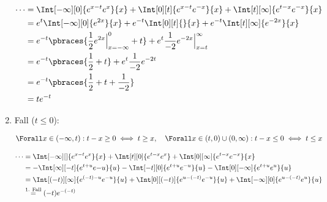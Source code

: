 \begin{solution}
\begin{enumerate}[label = \arabic*.]
    \begin{align*}
        \cdots
        & =
        \Int[-\infty][0]
        {
            e^{x - t}
            e^x
        }{x}
        +
        \Int[0][t]
        {
            e^{x - t}
            e^{-x}
        }{x}
        +
        \Int[t][\infty]
        {
            e^{t - x}
            e^{-x}
        }{x} \\
        & =
        e^{t}
        \Int[-\infty][0]
        {
            e^{2x}
        }{x}
        +
        e^{-t}
        \Int[0][t]{}{x}
        +
        e^{-t}
        \Int[t][\infty]
        {
            e^{-2 x}
        }{x} \\
        & =
        e^{-t}
        \pbraces
        {
            \frac{1}{2}
            e^{2 x} \Big |_{x = -\infty}^0
            +
            t
        }
        +
        e^t
        \frac{1}{-2}
        e^{-2 x} \Big |_{x=t}^\infty \\
        & =
        e^{-t}
        \pbraces
        {
            \frac{1}{2}
            +
            t
        }
        +
        e^t
        \frac{1}{-2}
        e^{-2 t} \\
        & =
        e^{-t}
        \pbraces
        {
            \frac{1}{2}
            +
            t
            +
            \frac{1}{-2}
        } \\
        & =
        t e^{-t}
    \end{align*}

    \item Fall ($t \leq 0$):
    
    \begin{align*}
        \Forall x \in (-\infty, t):
        t - x \geq 0
        \iff
        t \geq x,
        \quad
        \Forall x \in (t, 0) \cup (0, \infty):
        t - x \leq 0
        \iff
        t \leq x
    \end{align*}

    \begin{align*}
        \cdots
        & =
        \Int[-\infty][]
        {
            e^{x - t}
            e^x
        }{x}
        +
        \Int[t][0]
        {
            e^{t - x}
            e^x
        }
        +
        \Int[0][\infty]
        {
            e^{t - x}
            e^{-x}
        }{x} \\
        & =
        -
        \Int[\infty][-t]
        {
            e^{t + u}
            e{-u}
        }{u}
        -
        \Int[-t][0]
        {
            e^{t + u}
            e^{-u}                
        }{u}
        -
        \Int[0][-\infty]
        {
            e^{t + u}
            e^u
        }{u} \\
        & =
        \Int[(-t)][\infty]
        {
            e^{(-t) - u}
            e^{-u}
        }{u}
        +
        \Int[0][(-t)]
        {
            e^{u - (-t)}
            e^{-u}
        }{u}
        +
        \Int[-\infty][0]
        {
            e^{u - (-t)}
            e^u
        }{u} \\
        & \stackrel
        {
            \text{1. Fall}
        }{=}
        (-t) e^{-(-t)}
    \end{align*}


\end{enumerate}
\end{solution}
